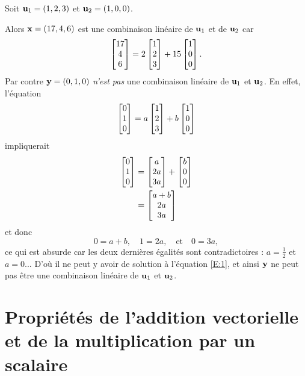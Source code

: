\begin{myexample}
Soit ${\mathbf{u}_1} = (1,2,3)$ et ${\mathbf{u}_2} = (1,0,0)$.  

Alors $\mathbf{x} = (17,4,6)$ est une combinaison linéaire de ${\mathbf{u}_1}$ et de ${\mathbf{u}_2}$ car
$$
\left[ \begin{matrix} 17\\4\\6 \end{matrix} \right] = 2 \left[ \begin{matrix} 1\\2\\3 \end{matrix} \right] + 15 \left[ \begin{matrix} 1\\0\\0 \end{matrix} \right].
$$
Par contre $\mathbf{y} = (0,1,0)$ \emph{n'est pas} une combinaison linéaire de
${\mathbf{u}_1}$ et ${\mathbf{u}_2}$. En effet, l'équation
\begin{equation} \label{E:1}
\left[ \begin{matrix} 0\\1\\0 \end{matrix} \right] = a \left[ \begin{matrix} 1\\2\\3 \end{matrix} \right] + b\left[ \begin{matrix} 1\\0\\0 \end{matrix} \right]
\end{equation}
impliquerait 
\begin{align*}
\left[ \begin{matrix} 0\\1\\0 \end{matrix} \right] &= \left[ \begin{matrix} a\\2a\\3a \end{matrix} \right] + \left[ \begin{matrix} b\\0\\0 \end{matrix} \right]\\
&= \left[ \begin{matrix} a+b\\2a \\3a \end{matrix} \right]
\end{align*}
et donc
$$
0 = a+b, \quad 1 = 2a, \quad \text{et} \quad 0 = 3a,
$$ 
ce qui est absurde car les deux dernières égalités sont contradictoires : $a=\frac12$ et $a=0$... D'o\`u
il ne peut y avoir de solution à l'équation \eqref{E:1}, et ainsi $\mathbf{y}$
ne peut pas être une combinaison linéaire de ${\mathbf{u}_1}$ et ${\mathbf{u}_2}$.
\end{myexample}


\section{Propriétés de l'addition vectorielle et de la multiplication par un scalaire}



